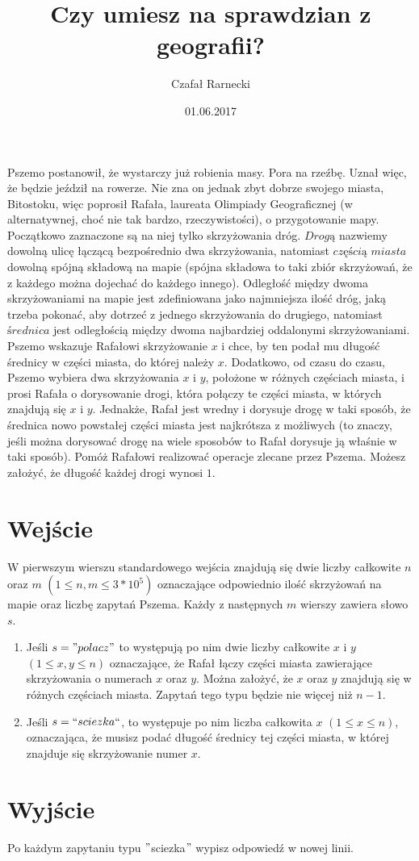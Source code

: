 \documentclass[zad,zawodnik,utf8]{sinol}
\title{Czy umiesz na sprawdzian z geografii?}
\author{Czafał Rarnecki} %
\date{01.06.2017}
\begin{document}
\begin{tasktext}

	Pszemo postanowił, że wystarczy już robienia masy. Pora na rzeźbę. Uznał więc, że będzie jeździł na rowerze. Nie zna on jednak zbyt dobrze swojego miasta, Bitostoku, więc poprosił Rafała, laureata Olimpiady Geograficznej (w alternatywnej, choć nie tak bardzo, rzeczywistości), o przygotowanie mapy. Początkowo zaznaczone są na niej tylko skrzyżowania dróg. $Drogą$ nazwiemy dowolną ulicę łączącą bezpośrednio dwa skrzyżowania, natomiast $częścią$ $miasta$ dowolną spójną składową na mapie (spójna składowa to taki zbiór skrzyżowań, że z każdego można dojechać do każdego innego). Odległość między dwoma skrzyżowaniami na mapie jest zdefiniowana jako najmniejsza ilość dróg, jaką trzeba pokonać, aby dotrzeć z jednego skrzyżowania do drugiego, natomiast $średnica$ jest odległością między dwoma najbardziej oddalonymi skrzyżowaniami. Pszemo wskazuje Rafałowi skrzyżowanie $x$ i chce, by ten podał mu długość średnicy w części miasta, do której należy $x$. Dodatkowo, od czasu do czasu, Pszemo wybiera dwa skrzyżowania $x$ i $y$, położone w różnych częściach miasta, i prosi Rafała o dorysowanie drogi, która połączy te części miasta, w których znajdują się $x$ i $y$. Jednakże, Rafał jest wredny i dorysuje drogę w taki sposób, że średnica nowo powstałej części miasta jest najkrótsza z możliwych (to znaczy, jeśli można dorysować drogę na wiele sposobów to Rafał dorysuje ją właśnie w taki sposób). Pomóż Rafałowi realizować operacje zlecane przez Pszema. Możesz założyć, że długość każdej drogi wynosi $1$.

  \section{Wejście}

	W pierwszym wierszu standardowego wejścia znajdują się dwie liczby całkowite $n$ oraz $m$ $(1 \leq n, m \leq 3*10^5)$ oznaczające odpowiednio ilość skrzyżowań na mapie oraz
liczbę zapytań Pszema. Każdy z następnych $m$ wierszy zawiera słowo $s$.
\begin{enumerate}
	\item Jeśli $s = "polacz"$ to występują po nim dwie liczby całkowite $x$ i $y$ $(1 \leq x, y \leq n)$ oznaczające, że Rafał łączy części miasta zawierające skrzyżowania o numerach $x$ oraz $y$. Można założyć, że $x$ oraz $y$ znajdują się w różnych częściach miasta. Zapytań tego typu będzie nie więcej niż $n - 1$.
	\item Jeśli $s = ``sciezka``$, to występuje po nim liczba całkowita $x$ $(1 \leq x \leq n)$, oznaczająca, że musisz podać długość średnicy tej części miasta, w której znajduje się skrzyżowanie numer $x$.
\end{enumerate}

	\section{Wyjście}
	
	Po każdym zapytaniu typu $"$sciezka$"$ wypisz odpowiedź w nowej linii.



\end{tasktext}
\end{document}
